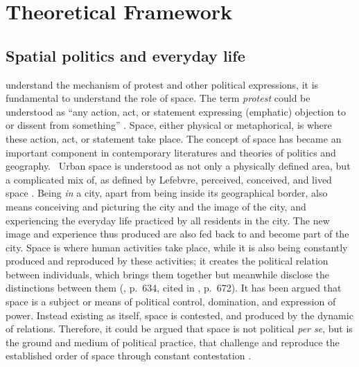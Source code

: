 \chapter{Theoretical Framework}\label{lit}

\section{Spatial politics and everyday life}

 understand the mechanism of protest and other political expressions, it is fundamental to understand the role of space. The term \textit{protest} could be understood as ``any action, act, or statement expressing (emphatic) objection to or dissent from something'' \citep{_protest_2007}. Space, either physical or metaphorical, is where these action, act, or statement take place. The concept of space has became an important component in contemporary literatures and theories of politics and geography.\ %
%
Urban space is understood as not only a physically defined area, but a complicated mix of, as defined by Lefebvre, perceived, conceived, and lived space \citep{schmidt_henry_2008}. Being \textit{in} a city, apart from being inside its geographical border, also means conceiving and picturing the city and the image of the city, and experiencing the everyday life practiced by all residents in the city. The new image and experience thus produced are also fed back to and become part of the city. Space is where human activities take place, while it is also being constantly produced and reproduced by these activities; it creates the political relation between individuals, which brings them together but meanwhile disclose the distinctions between them (\citealp{canovan_politics_1985}, p.~634, cited in \citealp{dikec_space_2012}, p.~672). It has been argued that space is a subject or means of political control, domination, and expression of power. Instead existing as itself, space is contested, and produced by the dynamic of relations. Therefore, it could be argued that space is not political \textit{per se}, but is the ground and medium of political practice, that challenge and reproduce the established order of space through constant contestation \citep{dikec_space_2012,hou_not_2010,henaff_public_2001}.

